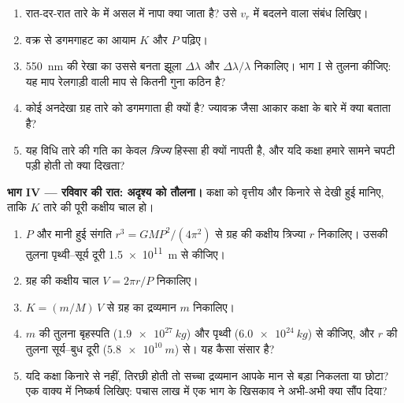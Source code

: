 \begin{problem}
\begin{enumerate}[resume]
  \item रात-दर-रात तारे के \emph{} में असल में नापा क्या
        जाता है? उसे $v_r$ में बदलने वाला संबंध लिखिए।
  \item वक्र से डगमगाहट का आयाम $K$ और  $P$
        पढ़िए।
  \item \qty{550}{nm} की रेखा का उससे बनता झूला $\Delta\lambda$ और $\Delta\lambda/\lambda$ निकालिए। भाग I
        से तुलना कीजिए: यह माप रेलगाड़ी वाली माप से कितनी गुना कठिन है?
  \item कोई अनदेखा ग्रह तारे को डगमगाता ही क्यों है? ज्यावक्र जैसा आकार
        कक्षा के बारे में क्या बताता है?
  \item यह विधि तारे की गति का केवल \emph{त्रिज्य} हिस्सा ही क्यों नापती है,
        और यदि कक्षा हमारे सामने चपटी पड़ी होती तो क्या दिखता?
\end{enumerate}

\medskip
\noindent\textbf{भाग IV --- रविवार की रात: अदृश्य को तौलना।}
कक्षा को वृत्तीय और किनारे से देखी हुई मानिए, ताकि $K$ तारे की
पूरी कक्षीय चाल हो।
\begin{enumerate}[resume]
  \item $P$ और मानी हुई संगति $r^3 = G M P^2/(4\pi^2)$ से ग्रह की कक्षीय त्रिज्या $r$
        निकालिए। उसकी तुलना पृथ्वी--सूर्य दूरी \qty{1.5e11}{m} से कीजिए।
  \item ग्रह की कक्षीय चाल $V = 2\pi r/P$ निकालिए।
  \item $K = (m/M)\,V$ से ग्रह का द्रव्यमान $m$ निकालिए।
  \item $m$ की तुलना बृहस्पति ($\qty{1.9e27}{kg}$) और पृथ्वी ($\qty{6.0e24}{kg}$) से कीजिए, और
        $r$ की तुलना सूर्य--बुध दूरी ($\qty{5.8e10}{m}$) से। यह कैसा संसार है?
  \item यदि कक्षा किनारे से नहीं, तिरछी होती तो सच्चा द्रव्यमान आपके
        मान से बड़ा निकलता या छोटा? एक वाक्य में निष्कर्ष लिखिए: पचास लाख में
        एक भाग के  खिसकाव ने अभी-अभी क्या सौंप दिया?
\end{enumerate}
\end{problem}
